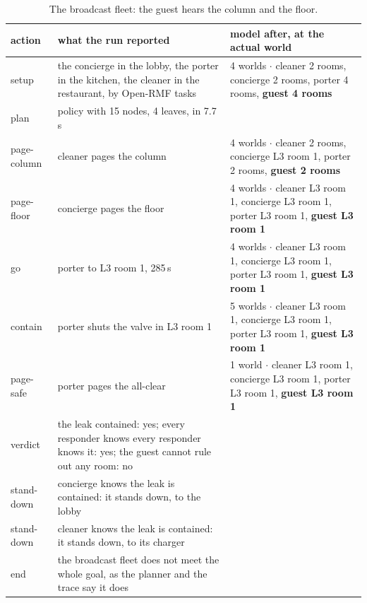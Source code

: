 \documentclass[11pt,a4paper]{article}
\theoremstyle{definition}
\begin{document}
\begin{table}[H]
\centering\scriptsize
\begin{tabularx}{\textwidth}{@{}l X X@{}}
\toprule
action & what the run reported & model after, at the actual world \\
\midrule
setup & the concierge in the lobby, the porter in the kitchen, the cleaner in the restaurant, by Open-RMF tasks & 4 worlds $\cdot$ cleaner 2 rooms, concierge 2 rooms, porter 4 rooms, \textbf{guest 4 rooms} \\
plan & policy with 15 nodes, 4 leaves, in 7.7 s &  \\
page-column & cleaner pages the column & 4 worlds $\cdot$ cleaner 2 rooms, concierge L3 room 1, porter 2 rooms, \textbf{guest 2 rooms} \\
page-floor & concierge pages the floor & 4 worlds $\cdot$ cleaner L3 room 1, concierge L3 room 1, porter L3 room 1, \textbf{guest L3 room 1} \\
go & porter to L3 room 1, 285\,s & 4 worlds $\cdot$ cleaner L3 room 1, concierge L3 room 1, porter L3 room 1, \textbf{guest L3 room 1} \\
contain & porter shuts the valve in L3 room 1 & 5 worlds $\cdot$ cleaner L3 room 1, concierge L3 room 1, porter L3 room 1, \textbf{guest L3 room 1} \\
page-safe & porter pages the all-clear & 1 world $\cdot$ cleaner L3 room 1, concierge L3 room 1, porter L3 room 1, \textbf{guest L3 room 1} \\
verdict & the leak contained: yes; every responder knows every responder knows it: yes; the guest cannot rule out any room: no &  \\
stand-down & concierge knows the leak is contained: it stands down, to the lobby &  \\
stand-down & cleaner knows the leak is contained: it stands down, to its charger &  \\
end & the broadcast fleet does not meet the whole goal, as the planner and the trace say it does &  \\
\bottomrule
\end{tabularx}
\caption{The broadcast fleet: the guest hears the column and the floor.}
\label{tab:run-broadcast}
\end{table}
\end{document}
